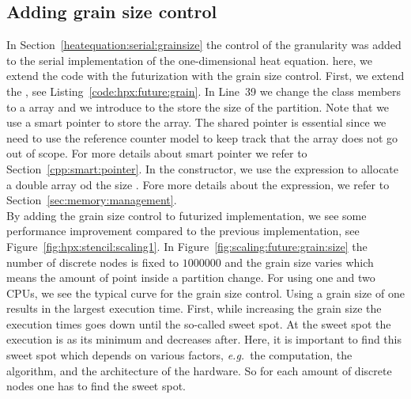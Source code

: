 \subsection{Adding grain size control}
In Section~\ref{heatequation:serial:grainsize} the control of the granularity was added to the serial implementation of the one-dimensional heat equation. here, we extend the code with the futurization with the grain size control. First, we extend the , see Listing~\ref{code:hpx:future:grain}. In Line~39 we change the class members to a  array and we introduce  to the store the size of the partition. Note that we use a smart pointer  to store the   array. The shared pointer is essential since we need to use the reference counter model to keep track that the array does not go out of scope. For more details about smart pointer we refer to Section~\ref{cpp:smart:pointer}. In the constructor, we use the expression  to allocate a double array od the size . Fore more details about the  expression, we refer to Section~\ref{sec:memory:management}. \\

By adding the grain size control to futurized implementation, we see some performance improvement compared to the previous implementation, see Figure~\ref{fig:hpx:stencil:scaling1}. In Figure~\ref{fig:scaling:future:grain:size} the number of discrete nodes is fixed to $1000000$ and the grain size varies which means the amount of point inside a partition change. For using one and two CPUs, we see the typical curve for the grain size control. Using a grain size of one results in the largest execution time. First, while increasing the grain size the execution times goes down until the so-called sweet spot. At the sweet spot the execution is as its minimum and decreases after. Here, it is important to find this sweet spot which depends on various factors, \emph{e.g.}\ the computation, the algorithm, and the architecture of the hardware. So for each amount of discrete nodes one has to find the sweet spot.


